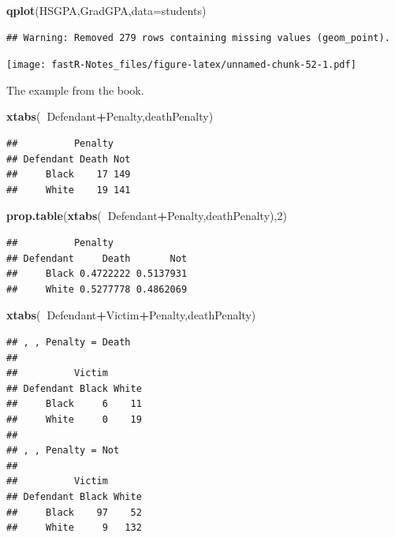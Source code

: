 \documentclass[]{book}
\newenvironment{Shaded}{\begin{snugshade}}{\end{snugshade}}
\newcommand{\KeywordTok}[1]{\textcolor[rgb]{0.13,0.29,0.53}{\textbf{#1}}}
\newcommand{\DataTypeTok}[1]{\textcolor[rgb]{0.13,0.29,0.53}{#1}}
\newcommand{\DecValTok}[1]{\textcolor[rgb]{0.00,0.00,0.81}{#1}}
\newcommand{\OperatorTok}[1]{\textcolor[rgb]{0.81,0.36,0.00}{\textbf{#1}}}
\newcommand{\NormalTok}[1]{#1}
\theoremstyle{definition}
\theoremstyle{definition}
\theoremstyle{definition}
\theoremstyle{remark}
\begin{document}
\begin{Shaded}
\begin{Highlighting}[]
\KeywordTok{qplot}\NormalTok{(HSGPA,GradGPA,}\DataTypeTok{data=}\NormalTok{students)}
\end{Highlighting}
\end{Shaded}

\begin{verbatim}
## Warning: Removed 279 rows containing missing values (geom_point).
\end{verbatim}

\texttt{[image: fastR-Notes\_files/figure-latex/unnamed-chunk-52-1.pdf]}

The example from the book.

\begin{Shaded}
\begin{Highlighting}[]
\KeywordTok{xtabs}\NormalTok{(}\OperatorTok{~}\NormalTok{Defendant}\OperatorTok{+}\NormalTok{Penalty,deathPenalty)}
\end{Highlighting}
\end{Shaded}

\begin{verbatim}
##          Penalty
## Defendant Death Not
##     Black    17 149
##     White    19 141
\end{verbatim}

\begin{Shaded}
\begin{Highlighting}[]
\KeywordTok{prop.table}\NormalTok{(}\KeywordTok{xtabs}\NormalTok{(}\OperatorTok{~}\NormalTok{Defendant}\OperatorTok{+}\NormalTok{Penalty,deathPenalty),}\DecValTok{2}\NormalTok{)}
\end{Highlighting}
\end{Shaded}

\begin{verbatim}
##          Penalty
## Defendant     Death       Not
##     Black 0.4722222 0.5137931
##     White 0.5277778 0.4862069
\end{verbatim}

\begin{Shaded}
\begin{Highlighting}[]
\KeywordTok{xtabs}\NormalTok{(}\OperatorTok{~}\NormalTok{Defendant}\OperatorTok{+}\NormalTok{Victim}\OperatorTok{+}\NormalTok{Penalty,deathPenalty)}
\end{Highlighting}
\end{Shaded}

\begin{verbatim}
## , , Penalty = Death
## 
##          Victim
## Defendant Black White
##     Black     6    11
##     White     0    19
## 
## , , Penalty = Not
## 
##          Victim
## Defendant Black White
##     Black    97    52
##     White     9   132
\end{verbatim}
\end{document}
